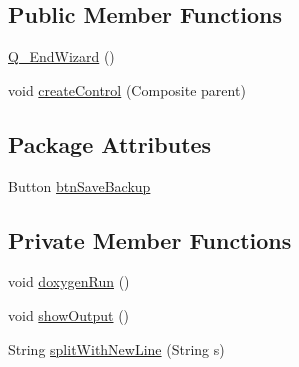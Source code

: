 \subsection*{Public Member Functions}
\begin{DoxyCompactItemize}
\item 
\hyperlink{classit_1_1isislab_1_1masonassisteddocumentation_1_1mason_1_1wizards_1_1_q___end_wizard_abc279fa31f6236a1af58d99df0eda1b9}{Q\-\_\-\-End\-Wizard} ()
\item 
void \hyperlink{classit_1_1isislab_1_1masonassisteddocumentation_1_1mason_1_1wizards_1_1_q___end_wizard_a3a0591b1e30644840d9828f5c67f8510}{create\-Control} (Composite parent)
\end{DoxyCompactItemize}
\subsection*{Package Attributes}
\begin{DoxyCompactItemize}
\item 
Button \hyperlink{classit_1_1isislab_1_1masonassisteddocumentation_1_1mason_1_1wizards_1_1_q___end_wizard_a94ab1b59917837c6b2708a44f2d5e2c7}{btn\-Save\-Backup}
\end{DoxyCompactItemize}
\subsection*{Private Member Functions}
\begin{DoxyCompactItemize}
\item 
void \hyperlink{classit_1_1isislab_1_1masonassisteddocumentation_1_1mason_1_1wizards_1_1_q___end_wizard_a42fd32637b3ac46154ab9c5ae720af05}{doxygen\-Run} ()
\item 
void \hyperlink{classit_1_1isislab_1_1masonassisteddocumentation_1_1mason_1_1wizards_1_1_q___end_wizard_a4564b1098ec942795cbd022ccbe338e0}{show\-Output} ()
\item 
String \hyperlink{classit_1_1isislab_1_1masonassisteddocumentation_1_1mason_1_1wizards_1_1_q___end_wizard_a89adac239da36e67abac1ec9c416bba4}{split\-With\-New\-Line} (String s)
\end{DoxyCompactItemize}
